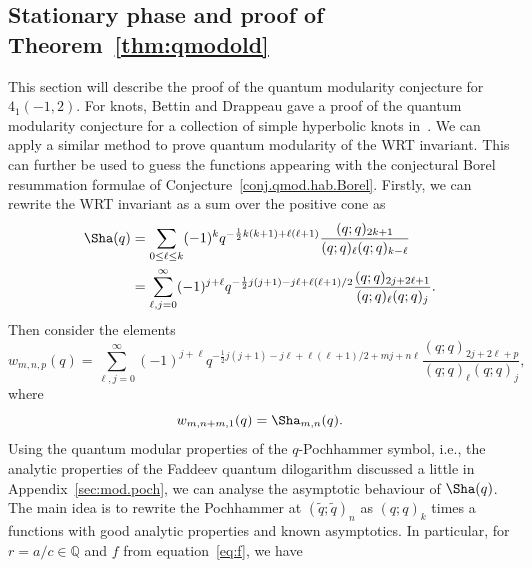\documentclass[pdftex]{sigma}
\numberwithin{equation}{section}
\def\BQ{\mathbb{Q}}
\def\tq{\tilde{q}}
\def\WRT{\Sha}
\def\BQ{\mathbb Q}
\def\tq{\tilde{q}}
\begin{document}
\subsection{Stationary phase and proof of Theorem~\ref{thm:qmodold}}
\label{statphase}
This section will describe the proof of the quantum modularity conjecture for $4_{1}(-1,2)$. For knots, Bettin and Drappeau gave a proof of the quantum modularity conjecture for a collection of simple hyperbolic knots in~\cite{BetDrap}. We can apply a similar method to prove quantum modularity of the WRT invariant. This can further be used to guess the functions appearing with the conjectural Borel resummation formulae of Conjecture~\ref{conj.qmod.hab.Borel}. Firstly, we can rewrite the WRT invariant as a sum over the positive cone as
\begin{align*}
 \WRT(q)
 &{}=
 \sum_{0\leq\ell\leq k}(-1)^{k}q^{-\frac{1}{2}k(k+1)+\ell(\ell+1)}\frac{(q;q)_{2k+1}}{(q;q)_{\ell}(q;q)_{k-\ell}}\\
 &{}=
 \sum_{\ell,j=0}^{\infty}(-1)^{j+\ell}q^{-\frac{1}{2}j(j+1)-j\ell+\ell(\ell+1)/2}\frac{(q;q)_{2j+2\ell+1}}{(q;q)_{\ell}(q;q)_{j}} .
\end{align*}
Then consider the elements
\[
 w_{m,n,p}(q)
  =
 \sum_{\ell,j=0}^{\infty}(-1)^{j+\ell}q^{-\frac{1}{2}j(j+1)-j\ell+\ell(\ell+1)/2+mj+n\ell}\frac{(q;q)_{2j+2\ell+p}}{(q;q)_{\ell}(q;q)_{j}} ,
\]
where
\[
 w_{m,n+m,1}(q) =\WRT_{m,n}(q) .
\]
Using the quantum modular properties of the $q$-Pochhammer symbol, i.e., the analytic properties of the Faddeev quantum dilogarithm discussed a little in Appendix~\ref{sec:mod.poch}, we can analyse the asymptotic behaviour of $\WRT(q)$. The main idea is to rewrite the Pochhammer at $(\tq;\tq)_{n}$ as $(q;q)_{k}$ times a functions with good analytic properties and known asymptotics. In particular, for $r=a/c\in\BQ$ and $f$ from equation~\eqref{eq:f}, we have
\end{document}
